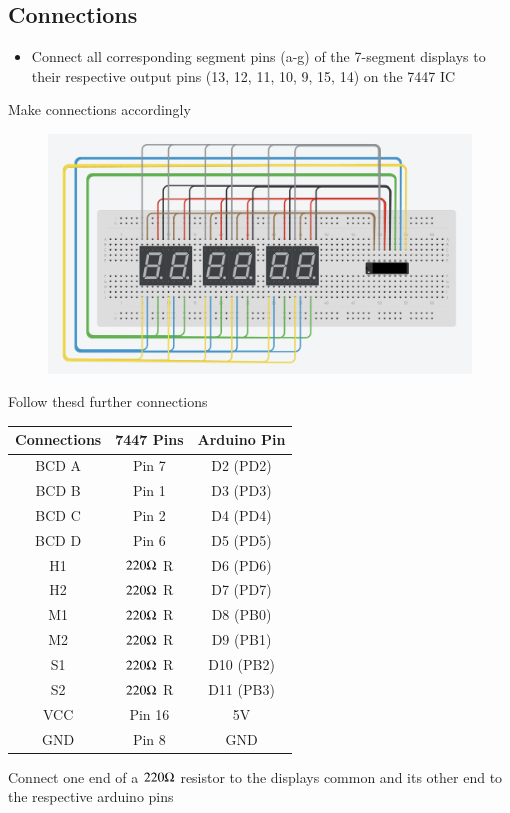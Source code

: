 \documentclass[journal]{IEEEtran}
\begin{document}
\subsection*{Connections}
\begin{itemize}
    \item Connect all corresponding segment pins (a-g) of the 7-segment displays to their respective output pins (13, 12, 11, 10, 9, 15, 14) on the 7447 IC
\end{itemize}
Make connections accordingly 
\begin{figure}[H]
    \centering
    \includegraphics[width=0.8\linewidth]{figs/multiplexing .png}
\end{figure}

Follow thesd further connections \\
\begin{table}[H]
    \centering
    \begin{tabular}{|c|c|c|}
        \hline
        \textbf{Connections} & \textbf{7447 Pins} & \textbf{Arduino Pin} \\
        \hline
        BCD A & Pin 7 & D2 (PD2) \\
        BCD B        & Pin 1 & D3 (PD3) \\
        BCD C        & Pin 2 & D4 (PD4) \\
        BCD D   & Pin 6 & D5 (PD5) \\
        \hline
        H1    & $220\ohm$ R& D6 (PD6) \\
        H2   & $220\ohm$ R & D7 (PD7) \\
        M1  & $220\ohm$ R & D8 (PB0) \\
        M2 & $220\ohm$ R& D9 (PB1) \\
        S1  & $220\ohm$ R & D10 (PB2) \\
        S2 & $220\ohm$ R& D11 (PB3) \\
        \hline
        VCC & Pin 16      & 5V   \\
        GND & Pin 8        & GND    \\
        \hline
    \end{tabular}
\end{table}
Connect one end of a $220\ohm$ resistor to the displays common and its other end to the respective arduino pins 
\newpage
\end{document}
